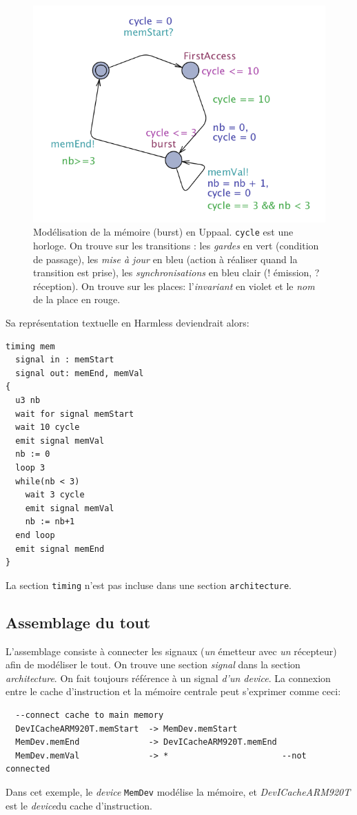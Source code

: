 \documentclass[11pt,a4paper]{article}
\begin{document}
\begin{figure}[htbp] %
   \centering
   \includegraphics[width=0.5 \linewidth]{memBurstUppaal.png} 
   \caption{Modélisation de la mémoire (burst) en Uppaal. \texttt{cycle} est une horloge. On trouve sur les transitions : les \emph{gardes} en vert (condition de passage), les \emph{mise à jour} en bleu (action à réaliser quand la transition est prise), les \emph{synchronisations} en bleu clair  (! émission, ? réception). On trouve sur les places: l'\emph{invariant} en violet et le \emph{nom} de la place en rouge.}
   \label{fig:automateMem}
\end{figure}

Sa représentation textuelle en Harmless deviendrait alors:
\begin{lstlisting}
timing mem
  signal in : memStart
  signal out: memEnd, memVal
{
  u3 nb
  wait for signal memStart
  wait 10 cycle
  emit signal memVal
  nb := 0
  loop 3
  while(nb < 3)
    wait 3 cycle 
    emit signal memVal
    nb := nb+1
  end loop
  emit signal memEnd
}
\end{lstlisting}

La section \texttt{timing} n'est pas incluse dans une section \texttt{architecture}.

\subsection{Assemblage du tout}
\label{sec:assemblage}
L'assemblage consiste à connecter les signaux (\emph{un} émetteur avec \emph{un} récepteur) afin de modéliser le tout. On trouve une section \emph{signal} dans la section \emph{architecture}. On fait toujours référence à un signal \emph{d'un device}.
La connexion entre le cache d'instruction et la mémoire centrale peut s'exprimer comme ceci:
\begin{lstlisting}
  --connect cache to main memory
  DevICacheARM920T.memStart  -> MemDev.memStart
  MemDev.memEnd              -> DevICacheARM920T.memEnd
  MemDev.memVal              -> *                       --not connected
\end{lstlisting}
Dans cet exemple, le \emph{device} \texttt{MemDev} modélise la mémoire, et \emph{DevICacheARM920T} est le \emph{device}du cache d'instruction.
\end{document}
